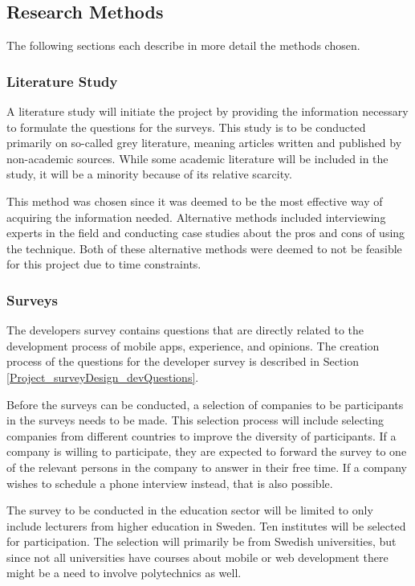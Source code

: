 \documentclass[a4paper,12pt]{article}
\begin{document}
\subsection{Research Methods}
\label{Method_methods}
The following sections each describe in more detail the methods chosen.

\subsubsection{Literature Study}
\label{Method_methods_study}
A literature study will initiate the project by providing the information necessary to formulate the questions for the surveys. This study is to be conducted primarily on so-called grey literature, meaning articles written and published by non-academic sources. While some academic literature will be included in the study, it will be a minority because of its relative scarcity.

This method was chosen since it was deemed to be the most effective way of acquiring the information needed. Alternative methods included interviewing experts in the field and conducting case studies about the pros and cons of using the technique. Both of these alternative methods were deemed to not be feasible for this project due to time constraints.

\subsubsection{Surveys}
\label{Method_methods_surveys}
The developers survey contains questions that are directly related to the development process of mobile apps, experience, and opinions. The creation process of the questions for the developer survey is described in Section \ref{Project_surveyDesign_devQuestions}.

Before the surveys can be conducted, a selection of companies to be participants in the surveys needs to be made. This selection process will include selecting companies from different countries to improve the diversity of participants. If a company is willing to participate, they are expected to forward the survey to one of the relevant persons in the company to answer in their free time. If a company wishes to schedule a phone interview instead, that is also possible.

The survey to be conducted in the education sector will be limited to only include lecturers from higher education in Sweden. Ten institutes will be selected for participation. The selection will primarily be from Swedish universities, but since not all universities have courses about mobile or web development there might be a need to involve polytechnics as well.
\end{document}
